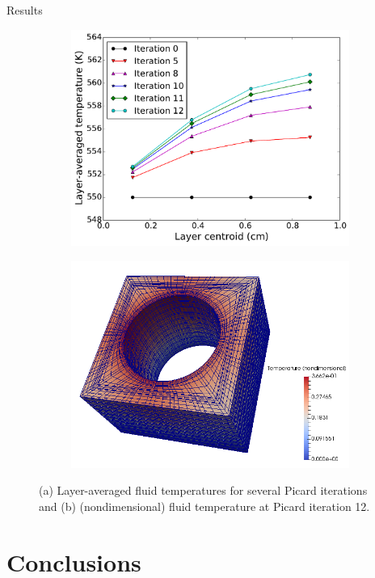 \documentclass[10pt]{beamer}
\begin{document}
\begin{frame}{Results}
\begin{figure}[!htb]
\centering
\begin{subfigure}{.5\textwidth}
  \centering
  \includegraphics[width=0.8\linewidth]{../Figures/layer_temps.pdf}
  \caption{}
\end{subfigure}%
\begin{subfigure}{.5\textwidth}
  \centering
  \includegraphics[width=0.9\linewidth]{../Figures/Nek_with_mesh.png}
  \caption{}
\end{subfigure}
\caption{(a) Layer-averaged fluid temperatures for several Picard iterations
and (b) (nondimensional) fluid temperature at Picard iteration 12.}
\label{fig:layer_temps}
\end{figure}
\end{frame}

\section{Conclusions}
\end{document}
